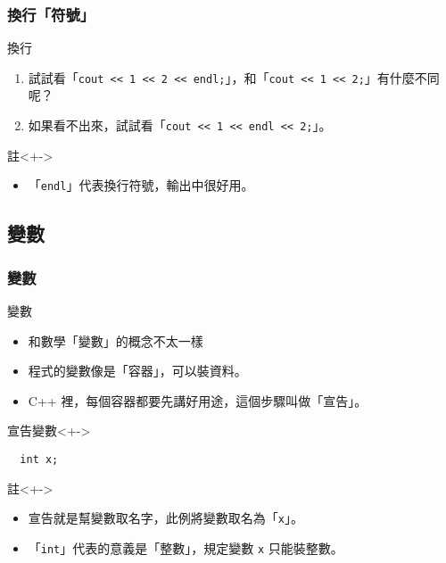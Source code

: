 \documentclass[utf8]{beamer}
\begin{document}
\begin{CJK}{UTF8}{bkai}
\begin{frame}[fragile]
  \frametitle{換行「符號」}
  \begin{block}{換行}
    \begin{enumerate}[<+->]
    \item 試試看「\lstinline{cout << 1 << 2 << endl;}」，和「\lstinline{cout << 1 << 2;}」有什麼不同呢？
    \item 如果看不出來，試試看「\lstinline{cout << 1 << endl << 2;}」。
    \end{enumerate}
  \end{block}
  \begin{exampleblock}{註}<+->
    \begin{itemize}
    \item 「\lstinline{endl}」代表\alert{換行}符號，輸出中很好用。
    \end{itemize}
  \end{exampleblock}
\end{frame}

\subsection{變數}

\begin{frame}[fragile]
  \frametitle{變數}
  \begin{block}{變數}
    \begin{itemize}[<+->]
    \item 和數學「變數」的概念不太一樣
    \item 程式的變數像是「\alert{容器}」，可以裝資料。
    \item C++ 裡，每個容器都要先講好\alert{用途}，這個步驟叫做「\alert{宣告}」。
    \end{itemize}
  \end{block}
  \begin{alertblock}{宣告變數}<+->
  \begin{lstlisting}
  int x;
  \end{lstlisting}
  \end{alertblock}
  \begin{exampleblock}{註}<+->
    \begin{itemize}[<+->]
    \item 宣告就是幫變數取名字，此例將變數取名為「\lstinline{x}」。
    \item 「\lstinline{int}」代表的意義是「\alert{整數}」，規定變數 \lstinline{x} \alert{只能裝整數}。
    \end{itemize}
  \end{exampleblock}
\end{frame}


\end{CJK}
\end{document}
